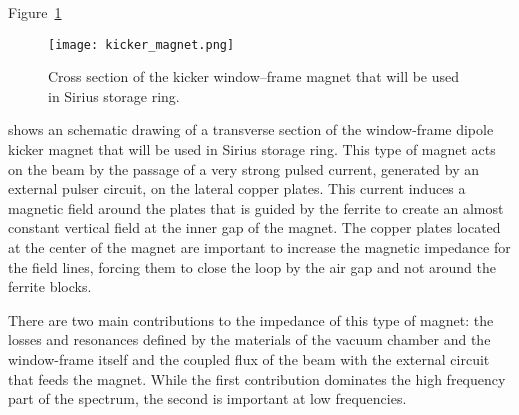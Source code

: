     Figure~\ref{fig:kicker_magnet}
    \begin{figure}[bt]
        \centering
        \texttt{[image: kicker\_magnet.png]}
        \caption{Cross section of the kicker window--frame magnet that will be used in Sirius storage ring.}
        \label{fig:kicker_magnet}
    \end{figure}
    shows an schematic drawing of a transverse section of the window-frame dipole kicker magnet that will be used in Sirius storage ring. This type of magnet acts on the beam by the passage of a very strong pulsed current, generated by an external pulser circuit, on the lateral copper plates. This current induces a magnetic field around the plates that is guided by the ferrite to create an almost constant vertical field at the inner gap of the magnet. The copper plates located at the center of the magnet are important to increase the magnetic impedance for the field lines, forcing them to close the loop by the air gap and not around the ferrite blocks.

    There are two main contributions to the impedance of this type of magnet: the losses and resonances defined by the materials of the vacuum chamber and the window-frame itself and the coupled flux of the beam with the external circuit that feeds the magnet. While the first contribution dominates the high frequency part of the spectrum, the second is important at low frequencies.

